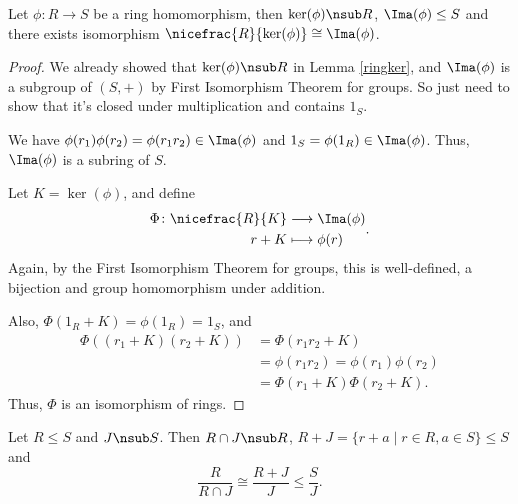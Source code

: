 \leavevmode
\begin{theorem}
    Let \(\phi: R \to S\) be a ring homomorphism, then \(\ker(\phi) \nsub R\), \(\Ima(\phi)\leq S\) and there exists isomorphism \(\nicefrac{R}{\ker(\phi)}\cong \Ima(\phi)\).
\end{theorem}
\begin{proof}
    We already showed that \(\ker(\phi)\nsub R\) in Lemma \eqref{ringker}, and \(\Ima(\phi)\) is a subgroup of \((S,+)\) by First Isomorphism Theorem for groups. So just need to show that it's closed under multiplication and contains \(1_S\).

    We have \(\phi(r_1)\phi(r_2) = \phi(r_1 r_2)\in \Ima(\phi)\) and \(1_S = \phi(1_R) \in \Ima(\phi)\). Thus, \(\Ima(\phi)\) is a subring of \(S\).

    Let \(K = \ker(\phi)\), and define
    \[
    \begin{aligned}
      \Phi\colon \nicefrac{R}{K} & \longrightarrow \Ima(\phi)      \\
      r+K          & \longmapsto \phi(r)
    \end{aligned}.
    \]
    Again, by the First Isomorphism Theorem for groups, this is well-defined, a bijection and group homomorphism under addition.

    Also, \(\Phi(1_R + K) = \phi(1_R) = 1_S\), and
    \begin{align*}
        \Phi((r_{1}+K)(r_2 + K)) &= \Phi(r_1 r_2 + K)\\
        &= \phi(r_{1} r_2) = \phi(r_1)\phi(r_2)\\
        &=\Phi(r_1 + K) \Phi(r_2 + K).
    \end{align*}
    Thus, \(\Phi\) is an isomorphism of rings.
\end{proof}
\begin{theorem}
    Let \(R\leq S\) and \(J \nsub S\). Then \(R \cap J \nsub R\), \(R + J = \{r + a \mid r \in R, a \in S\}\leq S\) and
    \[
        \frac{R}{R\cap J} \cong \frac{R + J}{J}\leq \frac{S}{J}.
    \]
\end{theorem}
